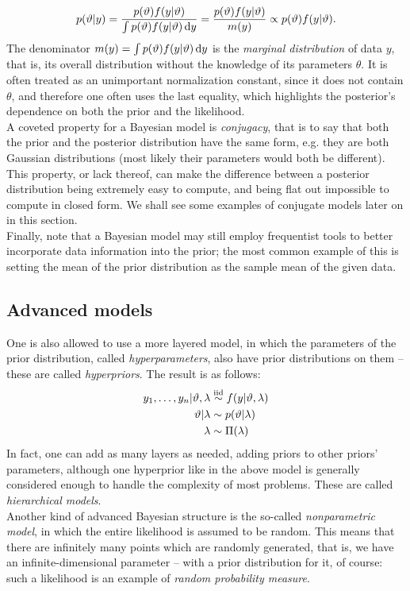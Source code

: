 $$ p(\vartheta|y) = \frac{p(\vartheta) f(y|\vartheta)}{\int p(\vartheta) f(y|\vartheta) \, \mathrm d y} =
\frac{p(\vartheta) f(y|\vartheta)}{m(y)} \propto p(\vartheta) f(y|\vartheta).
$$
The denominator $m(y) = \int p(\vartheta) f(y|\vartheta) \, \mathrm d y$ is the \emph{marginal distribution} of data $y$, that is, its overall distribution without the knowledge of its parameters $\theta$.
It is often treated as an unimportant normalization constant, since it does not contain $\theta$, and therefore one often uses the last equality, which highlights the posterior's dependence on both the prior and the likelihood. \\
A coveted property for a Bayesian model is \emph{conjugacy}, that is to say that both the prior and the posterior distribution have the same form, e.g. they are both Gaussian distributions (most likely their parameters would both be different).
This property, or lack thereof, can make the difference between a posterior distribution being extremely easy to compute, and being flat out impossible to compute in closed form.
We shall see some examples of conjugate models later on in this section. \\
Finally, note that a Bayesian model may still employ frequentist tools to better incorporate data information into the prior; the most common example of this is setting the mean of the prior distribution as the sample mean of the given data.

\subsection{Advanced models} %
One is also allowed to use a more layered model, in which the parameters of the prior distribution, called \emph{hyperparameters}, also have prior distributions on them -- these are called \emph{hyperpriors}.
The result is as follows:
\begin{align*}
	y_1, \dots, y_n | \theta, \lambda &\iidsim f(y|\theta, \lambda) \\ %
	\theta | \lambda &\sim p(\theta|\lambda) \\
	\lambda &\sim \Pi(\lambda)
\end{align*}
In fact, one can add as many layers as needed, adding priors to other priors' parameters, although one hyperprior like in the above model is generally considered enough to handle the complexity of most problems.
These are called \emph{hierarchical models}. \\
Another kind of advanced Bayesian structure is the so-called \emph{nonparametric model}, in which the entire likelihood is assumed to be random.
This means that there are infinitely many points which are randomly generated, that is, we have an infinite-dimensional parameter -- with a prior distribution for it, of course:
such a likelihood is an example of \emph{random probability measure}.


